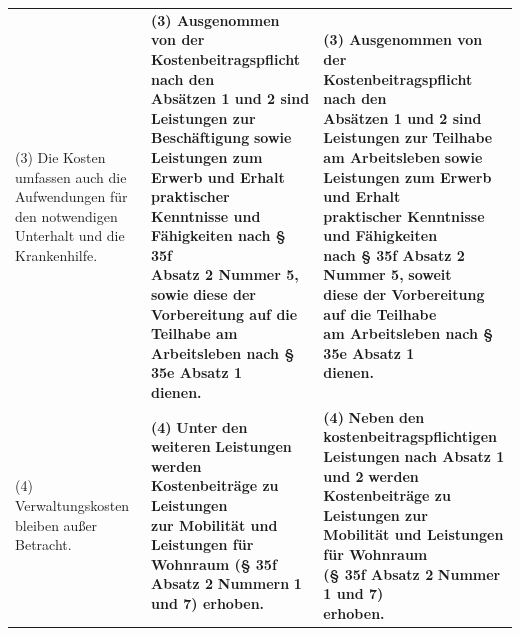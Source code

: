\documentclass[10pt,a4paper,landscape]{article}
\begin{document}
\begin{longtable}{|L{8.2cm}|L{8.2cm}|L{8.2cm}|}
\hhline{|---|}
(3) \textcolor{diffred}{Die Kosten umfassen auch} die  \newline \textcolor{diffred}{Aufwendungen für den notwendigen  \newline Unterhalt und die Krankenhilfe.} & \textbf{(3) Ausgenommen von der  \newline Kostenbeitragspflicht nach den  \newline Absätzen 1 und 2 sind Leistungen zur} \newline \textbf{\textcolor{diffred}{Beschäftigung}}\textbf{ sowie Leistungen zum  \newline Erwerb und Erhalt praktischer  \newline Kenntnisse und Fähigkeiten nach \S{} 35f  \newline Absatz 2 Nummer 5, }\textbf{\textcolor{diffred}{sowie}}\textbf{ diese der  \newline Vorbereitung auf die Teilhabe am  \newline Arbeitsleben nach \S{} 35e Absatz 1  \newline dienen. } & \textbf{(3) Ausgenommen von der  \newline Kostenbeitragspflicht nach den  \newline Absätzen 1 und 2 sind Leistungen zur} \newline \textbf{\textcolor{diffgreen}{Teilhabe am Arbeitsleben}}\textbf{ sowie  \newline Leistungen zum Erwerb und Erhalt  \newline praktischer Kenntnisse und Fähigkeiten  \newline nach \S{} 35f Absatz 2 Nummer 5, }\textbf{\textcolor{diffgreen}{soweit}}\textbf{  \newline diese der Vorbereitung auf die Teilhabe  \newline am Arbeitsleben nach \S{} 35e Absatz 1  \newline dienen. } \\
\hhline{|---|}
(4) \textcolor{diffred}{Verwaltungskosten bleiben außer  \newline Betracht.} & \textbf{(4) }\textbf{\textcolor{diffred}{Unter}}\textbf{ den }\textbf{\textcolor{diffred}{weiteren}}\textbf{ Leistungen  \newline werden Kostenbeiträge zu Leistungen  \newline zur Mobilität und Leistungen für  \newline Wohnraum (\S{} 35f Absatz 2 }\textbf{\textcolor{diffred}{Nummern}}\textbf{ 1  \newline und 7) erhoben. } & \textbf{(4) }\textbf{\textcolor{diffgreen}{Neben}}\textbf{ den }\textbf{\textcolor{diffgreen}{kostenbeitragspflichtigen}}\textbf{  \newline Leistungen }\textbf{\textcolor{diffgreen}{nach Absatz 1 und 2}}\textbf{ werden  \newline Kostenbeiträge zu Leistungen zur  \newline Mobilität und Leistungen für Wohnraum  \newline (\S{} 35f Absatz 2 }\textbf{\textcolor{diffgreen}{Nummer}}\textbf{ 1 und 7)  \newline erhoben. } \\

\end{longtable}
\end{document}
